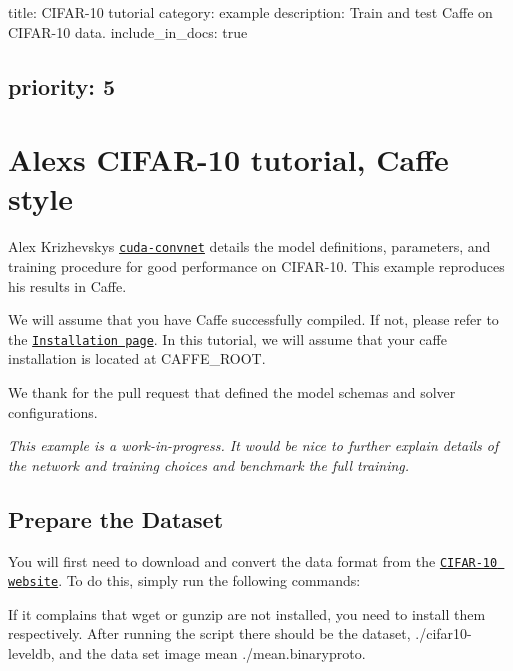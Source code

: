 

 title\+: C\+I\+F\+A\+R-\/10 tutorial category\+: example description\+: Train and test Caffe on C\+I\+F\+A\+R-\/10 data. include\+\_\+in\+\_\+docs\+: true \subsection*{priority\+: 5 }

\section*{Alex\textquotesingle{}s C\+I\+F\+A\+R-\/10 tutorial, Caffe style }

Alex Krizhevsky\textquotesingle{}s \href{https://code.google.com/p/cuda-convnet/}{\tt cuda-\/convnet} details the model definitions, parameters, and training procedure for good performance on C\+I\+F\+A\+R-\/10. This example reproduces his results in Caffe.

We will assume that you have Caffe successfully compiled. If not, please refer to the \href{/installation.html}{\tt Installation page}. In this tutorial, we will assume that your caffe installation is located at {\ttfamily C\+A\+F\+F\+E\+\_\+\+R\+O\+OT}.

We thank  for the pull request that defined the model schemas and solver configurations.

{\itshape This example is a work-\/in-\/progress. It would be nice to further explain details of the network and training choices and benchmark the full training.}

\subsection*{Prepare the Dataset }

You will first need to download and convert the data format from the \href{http://www.cs.toronto.edu/~kriz/cifar.html}{\tt C\+I\+F\+A\+R-\/10 website}. To do this, simply run the following commands\+: 


If it complains that {\ttfamily wget} or {\ttfamily gunzip} are not installed, you need to install them respectively. After running the script there should be the dataset, {\ttfamily ./cifar10-\/leveldb}, and the data set image mean {\ttfamily ./mean.binaryproto}.

